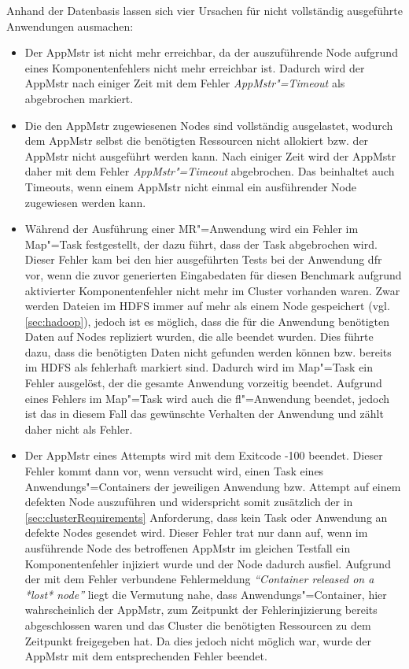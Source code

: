 Anhand der Datenbasis lassen sich vier Ursachen für nicht vollständig ausgeführte Anwendungen ausmachen:

\begin{itemize}
    \item
        Der \ac{AppMstr} ist nicht mehr erreichbar, da der auszuführende Node aufgrund eines Komponentenfehlers nicht mehr erreichbar ist.
        Dadurch wird der \ac{AppMstr} nach einiger Zeit mit dem Fehler \emph{\ac{AppMstr}"=Timeout} als abgebrochen markiert.
    \item
        Die den \ac{AppMstr} zugewiesenen Nodes sind vollständig ausgelastet, wodurch dem \ac{AppMstr} selbst die benötigten Ressourcen nicht allokiert bzw. der \ac{AppMstr} nicht ausgeführt werden kann.
        Nach einiger Zeit wird der \ac{AppMstr} daher mit dem Fehler \emph{\ac{AppMstr}"=Timeout} abgebrochen.
        Das beinhaltet auch Timeouts, wenn einem \ac{AppMstr} nicht einmal ein ausführender Node zugewiesen werden kann.
    \item
        Während der Ausführung einer \ac{MR}"=Anwendung wird ein Fehler im Map"=Task festgestellt, der dazu führt, dass der Task abgebrochen wird.
        Dieser Fehler kam bei den hier ausgeführten Tests bei der Anwendung \acl{dfr} vor, wenn die zuvor generierten Eingabedaten für diesen Benchmark aufgrund aktivierter Komponentenfehler nicht mehr im Cluster vorhanden waren.
        Zwar werden Dateien im \ac{HDFS} immer auf mehr als einem Node gespeichert (vgl. \autoref{sec:hadoop}), jedoch ist es möglich, dass die für die Anwendung benötigten Daten auf Nodes repliziert wurden, die alle beendet wurden.
        Dies führte dazu, dass die benötigten Daten nicht gefunden werden können bzw. bereits im \ac{HDFS} als fehlerhaft markiert sind.
        Dadurch wird im Map"=Task ein Fehler ausgelöst, der die gesamte Anwendung vorzeitig beendet.
        Aufgrund eines Fehlers im Map"=Task wird auch die \acl{fl}"=Anwendung beendet, jedoch ist das in diesem Fall das gewünschte Verhalten der Anwendung und zählt daher nicht als Fehler.
    \item
        Der \ac{AppMstr} eines Attempts wird mit dem Exitcode -100 beendet.
        Dieser Fehler kommt dann vor, wenn versucht wird, einen Task eines Anwendungs"=Containers der jeweiligen Anwendung bzw. Attempt auf einem defekten Node auszuführen und widerspricht somit zusätzlich der in \autoref{sec:clusterRequirements} Anforderung, dass kein Task oder Anwendung an defekte Nodes gesendet wird.
        Dieser Fehler trat nur dann auf, wenn im ausführende Node des betroffenen \ac{AppMstr} im gleichen Testfall ein Komponentenfehler injiziert wurde und der Node dadurch ausfiel.
        Aufgrund der mit dem Fehler verbundene Fehlermeldung \textit{\enquote{Container released on a *lost* node}} liegt die Vermutung nahe, dass Anwendungs"=Container, hier wahrscheinlich der \ac{AppMstr}, zum Zeitpunkt der Fehlerinjizierung bereits abgeschlossen waren und das Cluster die benötigten Ressourcen zu dem Zeitpunkt freigegeben hat.
        Da dies jedoch nicht möglich war, wurde der \ac{AppMstr} mit dem entsprechenden Fehler beendet.
\end{itemize}

